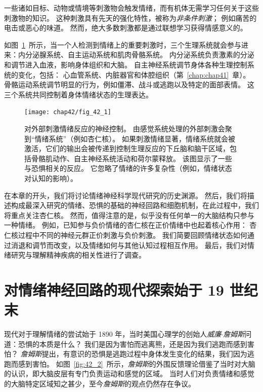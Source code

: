 一些诸如目标、动物或情境等刺激物会触发情绪，而有机体无需学习任何关于这些刺激物的知识。
这种刺激具有先天的强化特性，被称为\textit{非条件刺激}；
例如痛苦的电击或恶心的味道。
然而，绝大多数刺激都是通过联想学习获得情感意义的。


如图~\ref{fig:42_1}~所示，当一个人检测到情绪上的重要刺激时，三个生理系统就会参与进来：内分泌腺系统、自主运动系统和肌肉骨骼系统。
内分泌系统负责激素的分泌和调节进入血液，影响身体组织和大脑。
自主神经系统调节身体各种生理控制系统的变化，包括：
心血管系统、内脏器官和体腔组织（第~\ref{chap:chap41}~章）。
骨骼运动系统调节明显的行为，例如僵滞、战斗或逃跑以及特定的面部表情。
这三个系统共同控制着身体情绪状态的生理表达。


\begin{figure}[htbp]
	\centering
	\texttt{[image: chap42/fig\_42\_1]}
	\caption{对外部刺激情绪反应的神经控制。
		由感觉系统处理的外部刺激会聚到“情绪系统”（例如杏仁核）。
		如果刺激情绪显著，情绪系统就会被激活，它们的输出会被传递到控制生理反应的下丘脑和脑干区域，包括骨骼肌动作、自主神经系统活动和荷尔蒙释放。
		该图显示了一些与恐惧相关的反应。
		它忽略了情绪的许多复杂性（例如，情绪状态对认知的影响）。}
	\label{fig:42_1}
\end{figure}


在本章的开头，我们将讨论情绪神经科学现代研究的历史渊源。
然后，我们将描述构成最深入研究的情绪、恐惧的基础的神经回路和细胞机制，在此过程中，我们将重点关注杏仁核。
然而，值得注意的是，似乎没有任何单一的大脑结构只参与一种情绪。
例如，已知参与负价情绪的杏仁核在正价情绪中也起着核心作用：
杏仁核过程中不同的神经元群正价刺激与负价刺激。
我们简要回顾情绪状态如何通过消退和调节而改变，以及情绪如何与其他认知过程相互作用。
最后，我们对情绪研究与理解精神疾病的相关性进行了调查。



\section{对情绪神经回路的现代探索始于 19 世纪末}

现代对于理解情绪的尝试始于 1890 年，当时美国心理学的创始人\textit{威廉$\cdot$詹姆斯}问道：恐惧的本质是什么？
我们是因为害怕而逃离熊，还是因为我们逃跑而感到害怕？
\textit{詹姆斯}提出，有意识的恐惧是逃跑过程中身体发生变化的结果，我们因为逃跑而感到害怕。
如图~\ref{fig:42_2}~所示，\textit{詹姆斯}的外围反馈理论借鉴了当时对大脑的认识，即大脑皮层有专门负责运动和感觉的区域。
当时人们对负责情绪和感觉的大脑特定区域知之甚少，至今\textit{詹姆斯}的观点仍然存在争议。


